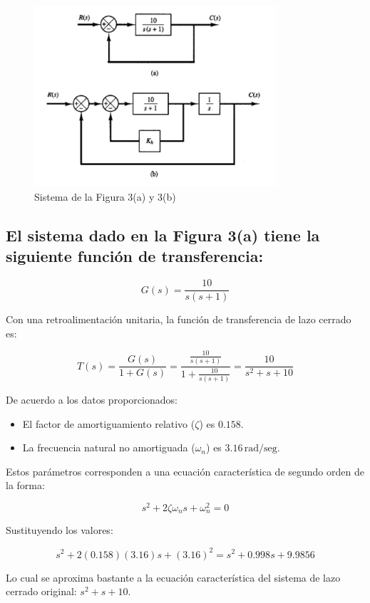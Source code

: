 \documentclass[10pt]{article}
\theoremstyle{definition}
\theoremstyle{remark}
\theoremstyle{definition}
\numberwithin{equation}{prob}
\begin{document}
\begin{figure}[h]
    \centering
    \includegraphics[width=0.8\textwidth]{./figures/Figura 3 ejercicio 5.png}
    \caption{Sistema de la Figura 3(a) y 3(b)}
\end{figure}


\subsection{El sistema dado en la Figura 3(a) tiene la siguiente función de transferencia:}

\[
G(s) = \frac{10}{s(s + 1)}
\]

Con una retroalimentación unitaria, la función de transferencia de lazo cerrado es:

\[
T(s) = \frac{G(s)}{1 + G(s)} = \frac{\frac{10}{s(s+1)}}{1 + \frac{10}{s(s+1)}} = \frac{10}{s^2 + s + 10}
\]

De acuerdo a los datos proporcionados:

\begin{itemize}
    \item El factor de amortiguamiento relativo (\(\zeta\)) es \(0.158\).
    \item La frecuencia natural no amortiguada (\(\omega_n\)) es \(3.16 \, \text{rad/seg}\).
\end{itemize}

Estos parámetros corresponden a una ecuación característica de segundo orden de la forma:

\[
s^2 + 2\zeta \omega_n s + \omega_n^2 = 0
\]

Sustituyendo los valores:

\[
s^2 + 2(0.158)(3.16)s + (3.16)^2 = s^2 + 0.998s + 9.9856
\]

Lo cual se aproxima bastante a la ecuación característica del sistema de lazo cerrado original: \(s^2 + s + 10\).
\end{document}
